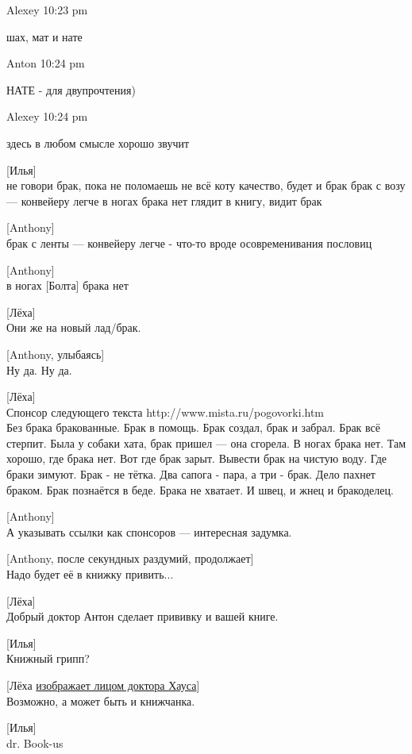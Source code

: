 Alexey 10:23 pm

    шах, мат и нате

Anton 10:24 pm

    НАТЕ - для двупрочтения)

Alexey 10:24 pm

    здесь в любом смысле хорошо звучит


[Илья]\\
не говори брак, пока не поломаешь
не всё коту качество, будет и брак
брак с возу — конвейеру легче
в ногах брака нет
глядит в книгу, видит брак


[Anthony]\\
брак с ленты — конвейеру легче - что-то вроде осовременивания пословиц


[Anthony]\\
в ногах [Болта] брака нет


[Лёха]\\
Они же на новый лад/брак.


[Anthony, улыбаясь]\\
Ну да. Ну да.


[Лёха]\\
Спонсор следующего текста http://www.mista.ru/pogovorki.htm\\

Без брака бракованные.
Брак в помощь.
Брак создал, брак и забрал.
Брак всё стерпит.
Была у собаки хата, брак пришел — она сгорела.
В ногах брака нет.
Там хорошо, где брака нет.
Вот где брак зарыт.
Вывести брак на чистую воду.
Где браки зимуют.
Брак - не тётка.
Два сапога - пара, а три - брак.
Дело пахнет браком.
Брак познаётся в беде.
Брака не хватает.
И швец, и жнец и бракоделец.


[Anthony]\\
А указывать ссылки как спонсоров --- интересная задумка.


[Anthony, после секундных раздумий, продолжает]\\
Надо будет её в книжку привить...


[Лёха]\\
Добрый доктор Антон сделает прививку и вашей книге.


[Илья]\\
Книжный грипп?


[Лёха \href{http://i5.imageban.ru/out/2014/09/04/442aff271469c9b3f514584819fcc35c.jpg}{изображает лицом доктора Хауса}]\\
Возможно, а может быть и книжчанка.


[Илья]\\
dr. Book-us


